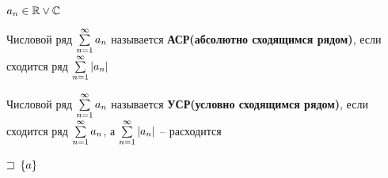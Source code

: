 
$a_n \in \mathbb{R} \vee \mathbb{C}$

\begin{defs}
	Числовой ряд $\sum\limits_{n=1}^{\infty}a_n$ называется \textbf{АСР(абсолютно сходящимся рядом)}, если сходится ряд $\sum\limits_{n=1}^{\infty}\left| a_n\right|$
\end{defs}

\begin{defs}
	Числовой ряд $\sum\limits_{n=1}^{\infty}a_n$ называется \textbf{УСР(условно сходящимся рядом)}, если сходится ряд $\sum\limits_{n=1}^{\infty}a_n$, а $\sum\limits_{n=1}^{\infty}\left| a_n\right|$ -- расходится
\end{defs}

\begin{proofs}
	$\sqsupset$ $\left\{ a\right\}$

\end{proofs}
